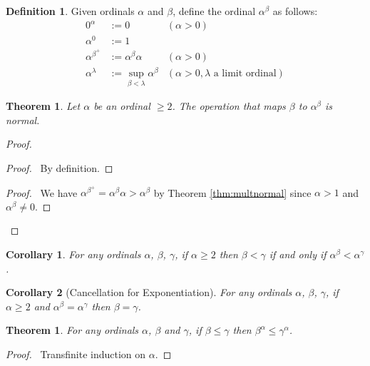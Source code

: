 \documentclass{book}
\let\qed\relax
\newtheorem{cor}{Corollary}[ax]
\newtheorem{thm}[ax]{Theorem}
\theoremstyle{definition}
\newtheorem{df}[ax]{Definition}
\begin{document}
\begin{df}
Given ordinals $\alpha$ and $\beta$, define the ordinal $\alpha^\beta$ as follows:
\begin{align*}
0^\alpha & := 0 & (\alpha > 0) \\
\alpha^0 & := 1 \\
\alpha^{\beta^+} & := \alpha^\beta \alpha & (\alpha > 0) \\
\alpha^\lambda & := \sup_{\beta < \lambda} \alpha^\beta & (\alpha > 0, \lambda \text{ a limit ordinal})
\end{align*}
\end{df}

\begin{thm}
Let $\alpha$ be an ordinal $\geq 2$. The operation that maps $\beta$ to $\alpha^\beta$ is normal.
\end{thm}

\begin{proof}
\pf
{}
\begin{proof}
	\pf\ By definition.
\end{proof}
\begin{proof}
	\pf\ We have $\alpha^{\beta^+} = \alpha^\beta \alpha > \alpha^\beta$ by Theorem \ref{thm:multnormal} since $\alpha > 1$ and $\alpha^\beta \neq 0$.
\end{proof}
\qed
\end{proof}

\begin{cor}
For any ordinals $\alpha$, $\beta$, $\gamma$, if $\alpha \geq 2$ then $\beta < \gamma$ if and only if $\alpha^\beta < \alpha^\gamma$.
\end{cor}

\begin{cor}[Cancellation for Exponentiation]
For any ordinals $\alpha$, $\beta$, $\gamma$, if $\alpha \geq 2$ and $\alpha^\beta = \alpha^\gamma$ then $\beta = \gamma$.
\end{cor}

\begin{thm}
For any ordinals $\alpha$, $\beta$ and $\gamma$, if $\beta \leq \gamma$ then $\beta^\alpha \leq \gamma^\alpha$.
\end{thm}

\begin{proof}
\pf\ Transfinite induction on $\alpha$.
\end{proof}
\end{document}
